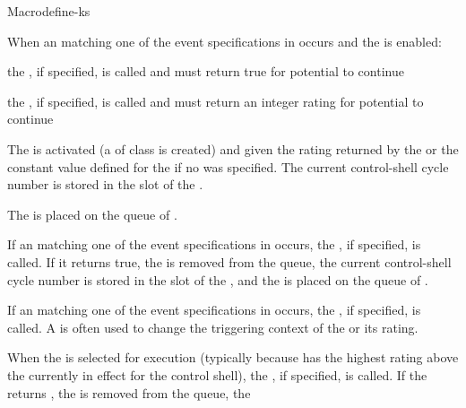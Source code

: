 \documentclass[10pt,twoside,english,pdftex]{article}
\begin{document}
\begin{functiondoc}{Macro}{define-ks}
\begin{tightitemize}
\item When an  matching one of the event specifications in
   occurs and the  is enabled:
\begin{tightitemize}
\item the , if specified, is called and must
  return true for potential  to continue
\item the , if specified, is called and must
  return an integer rating for potential  to continue
\end{tightitemize}
\item The  is activated (a  of class
   is created) and given the rating returned by the
   or the constant 
  value defined for the  if no 
  was specified.  The current control-shell cycle number is stored in the
   slot of the 
  .
\item The  is placed on the queue of
  .
\item If an  matching one of the event specifications in
   occurs, the
  , if specified, is called.  If it returns
  true, the  is removed from the 
  queue, the current control-shell cycle number is stored in the
   slot of the , and the 
  is placed on the queue of .
\item If an  matching one of the event specifications in
   occurs, the ,
  if specified, is called.  A  is often used
  to change the triggering context of the  or its rating.
\item When the  is selected for execution (typically
  because has the highest rating above the
   currently in effect for the
  control shell), the , if specified, is
  called. If the  returns \nil, the
   is removed from the  queue, the

\end{tightitemize}
\end{functiondoc}
\end{document}

